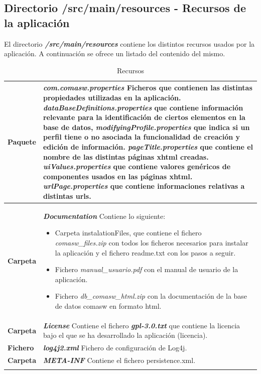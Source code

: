 \subsection{Directorio /src/main/resources - Recursos de la aplicación}
\label{sub:recursos-aplicacion}
El directorio \textit{\textbf{/src/main/resources}} contiene los distintos recursos usados por la aplicación. A continuación se ofrece un listado del contenido del mismo.


\begin{longtable}{m{1cm} m{11cm}}
    \caption{Recursos}
    \label{tab:recursos}\\  	
    \rowcolors{2}{white}{white}
    \textbf{Paquete} & \textit{\textbf{com.comasw.properties}} \newline
    Ficheros que contienen las distintas propiedades utilizadas en la aplicación.\newline
    \textit{dataBaseDefinitions.properties} que contiene información relevante para la identificación de ciertos elementos en la base de datos,
\textit{modifyingProfile.properties} que indica si un perfil tiene o no asociada la funcionalidad de creación y edición de información.
\textit{pageTitle.properties} que contiene el nombre de las distintas páginas \acrshort{xhtml} creadas.
\textit{uiValues.properties} que contiene valores genéricos de componentes usados en las páginas \acrshort{xhtml}.
\textit{urlPage.properties} que contiene informaciones relativas a distintas urls.
\\\hline
	\textbf{Carpeta} & \textit{\textbf{Documentation}} \newline
    Contiene lo siguiente:
    \begin{itemize}
    \item Carpeta instalationFiles, que contiene el fichero \emph{comasw\_files.zip} con todos los ficheros necesarios para instalar la aplicación y el fichero readme.txt con los pasos a seguir.
    \item Fichero \emph{manual\_usuario.pdf} con el manual de usuario de la aplicación.
    \item Fichero \emph{db\_comasw\_html.zip} con la documentación de la base de datos comasw en formato html.
    \end{itemize}    
    \\\hline
	\textbf{Carpeta} & \textit{\textbf{License}} \newline
	Contiene el fichero \emph{\textbf{gpl-3.0.txt}} que contiene la licencia bajo el que se ha desarrollado la aplicación (\acrshort{licencia}).
    \\\hline
	\textbf{Fichero} & \textit{\textbf{log4j2.xml}} \newline
    Fichero de configuración de Log4j.
	\\\hline
	\textbf{Carpeta} & \textit{\textbf{META-INF}} \newline
    Contiene el fichero persistence.xml.
	\\\hline
\\\hline

\end{longtable}    



